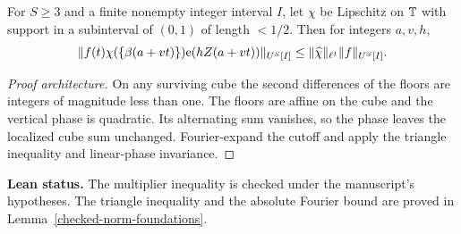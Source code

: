 \begin{lemma}\label{l:vertical-mode-multiplier}
\leanok
For $S\ge3$ and a finite nonempty integer interval $I$, let $\chi$ be
Lipschitz on $\mathbb T$ with support in a subinterval of $(0,1)$ of length
$<1/2$. Then for integers $a,v,h$,
\[
 \lVert f(t)\chi(\{\beta(a+vt)\})\mathrm e(hZ(a+vt))\rVert_{U^S[I]}
 \le \lVert\widehat\chi\rVert_{\ell^1}\lVert f\rVert_{U^S[I]}.
\]
\end{lemma}
\begin{proof}[Proof architecture]
\leanok
On any surviving cube the second differences of the floors are integers
of magnitude less than one. The floors are affine on the cube and the
vertical phase is quadratic. Its alternating sum vanishes, so the
phase leaves the localized cube sum unchanged. Fourier-expand the
cutoff and apply the triangle inequality and linear-phase invariance.
\end{proof}
\noindent\textbf{Lean status.} The multiplier inequality is checked
under the manuscript's hypotheses. The triangle inequality and the
absolute Fourier bound are proved in Lemma~\ref{checked-norm-foundations}.

